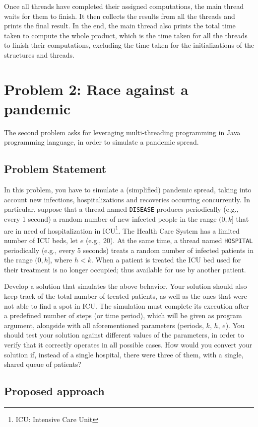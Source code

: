 \documentclass[acmlarge]{acmart}
\newcommand{\disease}{{\small \texttt{DISEASE}} }
\newcommand{\hospital}{{\small \texttt{HOSPITAL}} }
\begin{document}
Once all threads have completed their assigned computations, the main thread waits for them to finish. It then collects the results from all the threads and prints the final result. In the end, the main thread also prints the total time taken to compute the whole product, which is the time taken for all the threads to finish their computations, excluding the time taken for the initializations of the structures and threads.


\section{Problem 2: Race against a pandemic}
\label{section:problem2}
The second problem asks for leveraging multi-threading programming in Java programming language, in order to simulate a pandemic spread.
\subsection{Problem Statement}
In this problem, you have to simulate a (simplified) pandemic spread, taking into account new infections, hospitalizations and recoveries occurring concurrently. In particular, suppose that a thread named \disease produces periodically (e.g., every 1 second) a random number of new infected people in the range $(0, k]$ that are in need of hospitalization in ICU\footnote{ICU: Intensive Care Unit}. The Health Care System has a limited number of ICU beds, let $e$ (e.g., 20). At the same time, a thread named \hospital periodically (e.g., every 5 seconds) treats a random number of infected patients in the range $(0, h]$, where $h<k$. When a patient is treated the ICU bed used for their treatment is no longer occupied; thus available for use by another patient.

Develop a solution that simulates the above behavior. Your solution should also keep track of the total number of treated patients, as well as the ones that were not able to find a spot in ICU. The simulation must complete its execution after a predefined number of steps (or time period), which will be given as program argument, alongside with all aforementioned parameters (periods, $k$, $h$, $e$). You should test your solution against different values of the parameters, in order to verify that it correctly operates in all possible cases. How would you convert your solution if, instead of a single hospital, there were three of them, with a single, shared queue of patients?

\subsection{Proposed approach}
\end{document}
